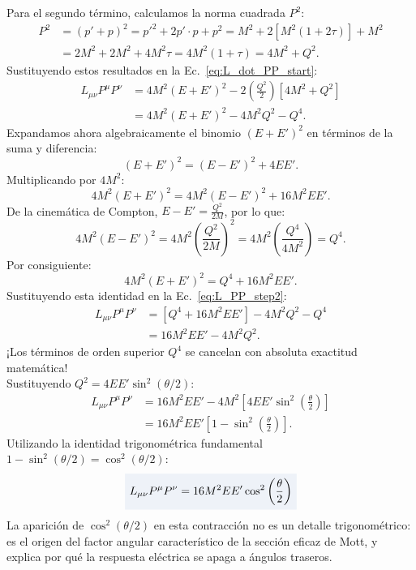 \documentclass[10pt,a4paper]{article}
\newcommand{\dest}[1]{{\setlength{\fboxsep}{4pt}\colorbox{colordest}{$\displaystyle #1$}}}
\begin{document}
Para el segundo término, calculamos la norma cuadrada $P^2$:
\begin{align}
P^2 &= (p' + p)^2 = p'^2 + 2 p' \cdot p + p^2 = M^2 + 2 [M^2(1 + 2\tau)] + M^2 \nonumber \\
&= 2 M^2 + 2 M^2 + 4 M^2 \tau = 4 M^2 (1 + \tau) = 4 M^2 + Q^2.
\end{align}
Sustituyendo estos resultados en la Ec.~\eqref{eq:L_dot_PP_start}:
\begin{align}
L_{\mu\nu} P^\mu P^\nu &= 4 M^2 (E + E')^2 - 2 \left( \frac{Q^2}{2} \right) \left[ 4 M^2 + Q^2 \right] \nonumber \\
&= 4 M^2 (E + E')^2 - 4 M^2 Q^2 - Q^4.
\label{eq:L_PP_step2}
\end{align}
Expandamos ahora algebraicamente el binomio $(E + E')^2$ en términos de la suma y diferencia:
\begin{equation}
(E + E')^2 = (E - E')^2 + 4 E E'.
\end{equation}
Multiplicando por $4 M^2$:
\begin{equation}
4 M^2 (E + E')^2 = 4 M^2 (E - E')^2 + 16 M^2 E E'.
\end{equation}
De la cinemática de Compton, $E - E' = \frac{Q^2}{2M}$, por lo que:
\begin{equation}
4 M^2 (E - E')^2 = 4 M^2 \left( \frac{Q^2}{2M} \right)^2 = 4 M^2 \left( \frac{Q^4}{4 M^2} \right) = Q^4.
\end{equation}
Por consiguiente:
\begin{equation}
4 M^2 (E + E')^2 = Q^4 + 16 M^2 E E'.
\end{equation}
Sustituyendo esta identidad en la Ec.~\eqref{eq:L_PP_step2}:
\begin{align}
L_{\mu\nu} P^\mu P^\nu &= \left[ Q^4 + 16 M^2 E E' \right] - 4 M^2 Q^2 - Q^4 \nonumber \\
&= 16 M^2 E E' - 4 M^2 Q^2.
\end{align}
¡Los términos de orden superior $Q^4$ se cancelan con absoluta exactitud matemática!\\
Sustituyendo $Q^2 = 4 E E' \sin^2(\theta/2)$:
\begin{align}
L_{\mu\nu} P^\mu P^\nu &= 16 M^2 E E' - 4 M^2 \left[ 4 E E' \sin^2\left(\frac{\theta}{2}\right) \right] \nonumber \\
&= 16 M^2 E E' \left[ 1 - \sin^2\left(\frac{\theta}{2}\right) \right].
\end{align}
Utilizando la identidad trigonométrica fundamental $1 - \sin^2(\theta/2) = \cos^2(\theta/2)$:
\begin{equation}
\dest{L_{\mu\nu} P^\mu P^\nu = 16 M^2 E E' \cos^2\left(\frac{\theta}{2}\right)}
\label{eq:L_dot_PP_final}
\end{equation}
La aparición de $\cos^2(\theta/2)$ en esta contracción no es un detalle trigonométrico: es el origen del factor angular característico de la sección eficaz de Mott, y explica por qué la respuesta eléctrica se apaga a ángulos traseros.
\end{document}
